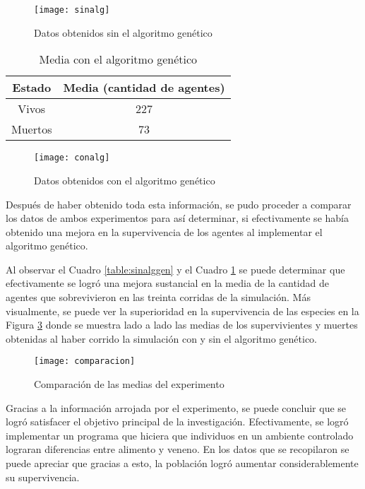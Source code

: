 \documentclass[times,10pt,twocolumn]{article}
\begin{document}
    \begin{figure}[h!]
        \centering
            \texttt{[image: sinalg]}
            \caption{Datos obtenidos sin el algoritmo genético}
            \label{fig:sinalg}
    \end{figure}
    
    
    \begin{table}[h!]
    \centering
    \caption{Media con el algoritmo genético}
    \hfill\break
    \begin{tabular}{c c}
    Estado & Media (cantidad de agentes) \\ [0.5ex]
    \hline
    Vivos & 227\\
    Muertos & 73\\
    \end{tabular}
    \label{table:conalggen}
    \end{table}
    
    \begin{figure}[h!]
        \centering
            \texttt{[image: conalg]}
            \caption{Datos obtenidos con el algoritmo genético}
            \label{fig:conalg}
    \end{figure}

Después de haber obtenido toda esta información, se pudo proceder a comparar los datos de ambos experimentos para así determinar, si efectivamente se había obtenido una mejora en la supervivencia de los agentes al implementar el algoritmo genético.\par
Al observar el Cuadro \ref{table:sinalggen} y el Cuadro \ref{table:conalggen} se puede determinar que efectivamente se logró una mejora sustancial en la media de la cantidad de agentes que sobrevivieron en las treinta corridas de la simulación. Más visualmente, se puede ver la superioridad en la supervivencia de las especies en la Figura \ref{fig:comparacion} donde se muestra lado a lado las medias de los supervivientes y muertes obtenidas al haber corrido la simulación con y sin el algoritmo genético.

    \begin{figure}[h!]
        \centering
            \texttt{[image: comparacion]}
            \caption{Comparación de las medias del experimento}
            \label{fig:comparacion}
    \end{figure}

Gracias a la información arrojada por el experimento, se puede concluir que se logró satisfacer el objetivo principal de la investigación. Efectivamente, se logró implementar un programa que hiciera que individuos en un ambiente controlado lograran diferencias entre alimento y veneno. En los datos que se recopilaron se puede apreciar que gracias a esto, la población logró aumentar considerablemente su supervivencia.
\end{document}
